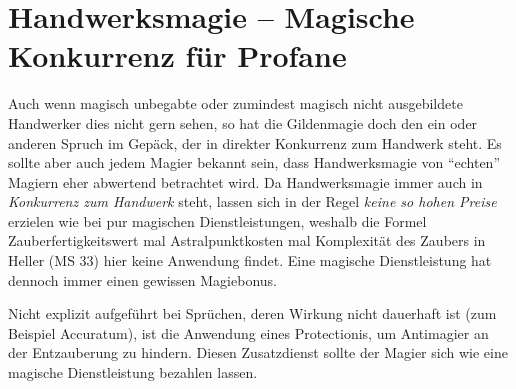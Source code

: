 \section{Handwerksmagie -- Magische Konkurrenz für Profane}
Auch wenn magisch unbegabte oder zumindest magisch nicht ausgebildete Handwerker dies nicht gern sehen, so hat die Gildenmagie doch den ein oder anderen Spruch im Gepäck, der in direkter Konkurrenz zum Handwerk steht. Es sollte aber auch jedem Magier bekannt sein, dass Handwerksmagie von \enquote{echten} Magiern eher abwertend betrachtet wird. Da Handwerksmagie immer auch in \textit{Konkurrenz zum Handwerk} steht, lassen sich in der Regel \textit{keine so hohen Preise} erzielen wie bei pur magischen Dienstleistungen, weshalb die Formel Zauberfertigkeitswert mal Astralpunktkosten mal Komplexität des Zaubers in Heller (MS 33) hier keine Anwendung findet. Eine magische Dienstleistung hat dennoch immer einen gewissen Magiebonus.

Nicht explizit aufgeführt bei Sprüchen, deren Wirkung nicht dauerhaft ist (zum Beispiel Accuratum), ist die Anwendung eines Protectionis, um Antimagier an der Entzauberung zu hindern. Diesen Zusatzdienst sollte der Magier sich wie eine magische Dienstleistung bezahlen lassen.

